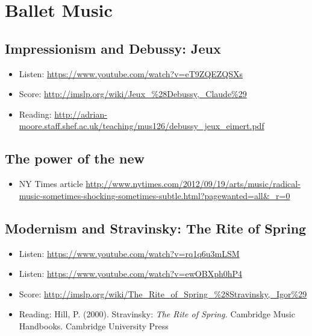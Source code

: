 
\chapter{Ballet Music}
\label{balletmusic}


\section{Impressionism and Debussy: Jeux}
\begin{itemize}
\item Listen: \url{https://www.youtube.com/watch?v=eT9ZQEZQSXs}
\item Score: \url{http://imslp.org/wiki/Jeux_%28Debussy,_Claude%29}
\item Reading: \url{http://adrian-moore.staff.shef.ac.uk/teaching/mus126/debussy_jeux_eimert.pdf}
\end{itemize}

\section{The power of the new}
\begin{itemize}
\item NY Times article \url{http://www.nytimes.com/2012/09/19/arts/music/radical-music-sometimes-shocking-sometimes-subtle.html?pagewanted=all&_r=0}
\end{itemize}

\section{Modernism and Stravinsky: The Rite of Spring}
\begin{itemize}
\item Listen: \url{https://www.youtube.com/watch?v=rq1q6u3mLSM}
\item Listen: \url{https://www.youtube.com/watch?v=ewOBXph0hP4}
\item Score: \url{http://imslp.org/wiki/The_Rite_of_Spring_%28Stravinsky,_Igor%29}
\item Reading: Hill, P. (2000). Stravinsky: \textit{The Rite of Spring.} Cambridge Music Handbooks. Cambridge University Press

\end{itemize}


